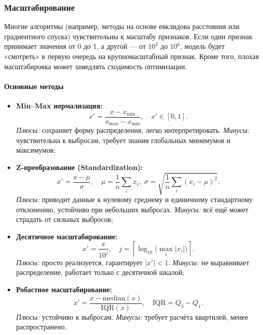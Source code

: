 \begin{center}
\subsubsection{Масштабирование}
\label{sec:scaling}

Многие алгоритмы (например, методы на основе евклидова расстояния или градиентного спуска) чувствительны к масштабу признаков. Если один признак принимает значения от 0 до 1, а другой — от \(10^3\) до \(10^6\), модель будет «смотреть» в первую очередь на крупномасштабный признак. Кроме того, плохая масштабировка может замедлять сходимость оптимизации.

\paragraph{Основные методы}
\begin{itemize}
  \item \textbf{Min–Max нормализация:}  
    \[
      x' = \frac{x - x_{\min}}{x_{\max} - x_{\min}},
      \quad x'\in[0,1].
    \]
    \emph{Плюсы:} сохраняет форму распределения, легко интерпретировать.  
    \emph{Минусы:} чувствительна к выбросам, требует знания глобальных минимумов и максимумов;
    
  \item \textbf{Z-преобразование (Standardization):}  
    \[
      x' = \frac{x - \mu}{\sigma},
      \quad \mu = \frac{1}{n}\sum_i x_i,\;
      \sigma = \sqrt{\frac{1}{n}\sum_i (x_i - \mu)^2}.
    \]
    \emph{Плюсы:} приводит данные к нулевому среднему и единичному стандартному отклонению, устойчиво при небольших выбросах.  
    \emph{Минусы:} всё ещё может страдать от сильных выбросов;
    
  \item \textbf{Десятичное масштабирование:}  
    \[
      x' = \frac{x}{10^j},\quad
      j = \left\lceil \log_{10}\bigl(\max_i |x_i|\bigr)\right\rceil.
    \]
    \emph{Плюсы:} просто реализуется, гарантирует \(|x'|<1\).  
    \emph{Минусы:} не выравнивает распределение, работает только с десятичной шкалой;
    
  \item \textbf{Робастное масштабирование:}  
    \[
      x' = \frac{x - \mathrm{median}(x)}{\mathrm{IQR}(x)},
      \quad \mathrm{IQR} = Q_3 - Q_1.
    \]
    \emph{Плюсы:} устойчиво к выбросам.  
    \emph{Минусы:} требует расчёта квартилей, менее распространено.
\end{itemize}


\end{center}
